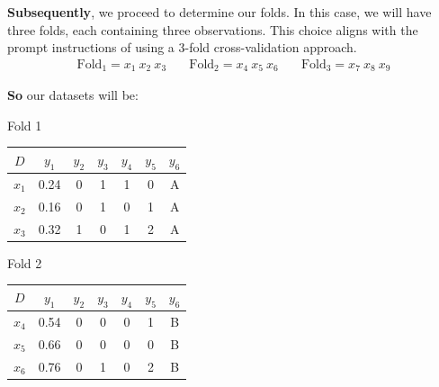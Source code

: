 \documentclass[12pt]{article}
\begin{document}
\begin{enumerate}[leftmargin=\labelsep]
\begin{enumerate}
                \textbf{Subsequently}, we proceed to determine our folds. In this case, we will have three folds, each containing three observations.
                This choice aligns with the prompt instructions of using a 3-fold cross-validation approach.
                \[
                  \begin{array}{ccc}
                    \text{Fold}_1 = x_1 \medspace x_2 \medspace x_3 & \quad
                    \text{Fold}_2 = x_4 \medspace x_5 \medspace x_6 & \quad
                    \text{Fold}_3 = x_7 \medspace x_8 \medspace x_9
                  \end{array}
                \]

                \textbf{So} our datasets will be:

                \begin{table}[H]
                  \centering

                  \begin{minipage}{.4\linewidth}
                    \centering
                    {\bfseries\strut Fold 1}
                    \begin{tabular}{c|cccccc}
                      \(D\)   & \(y_1\) & \(y_2\) & \(y_3\) & \(y_4\) & \(y_5\) & \(y_6\) \\
                      \hline
                      \(x_1\) & 0.24    & 0       & 1       & 1       & 0       & A       \\
                      \(x_2\) & 0.16    & 0       & 1       & 0       & 1       & A       \\
                      \(x_3\) & 0.32    & 1       & 0       & 1       & 2       & A       \\
                    \end{tabular}
                  \end{minipage}
                  \quad
                  \begin{minipage}{.4\linewidth}
                    \centering
                    {\bfseries\strut Fold 2}
                    \begin{tabular}{c|cccccc}
                      \(D\)   & \(y_1\) & \(y_2\) & \(y_3\) & \(y_4\) & \(y_5\) & \(y_6\) \\
                      \hline
                      \(x_4\) & 0.54    & 0       & 0       & 0       & 1       & B       \\
                      \(x_5\) & 0.66    & 0       & 0       & 0       & 0       & B       \\
                      \(x_6\) & 0.76    & 0       & 1       & 0       & 2       & B       \\
                    \end{tabular}
                  \end{minipage}


\end{table}
\end{enumerate}
\end{enumerate}
\end{document}
